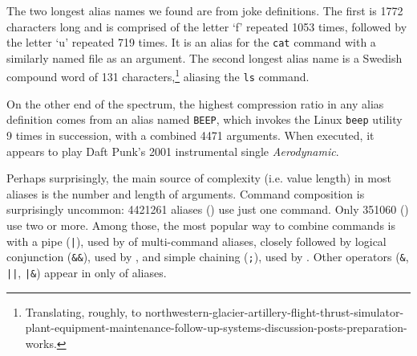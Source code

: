 The two longest alias names we found are from joke definitions.
The first is \num{1772} characters long and is comprised of the letter `f' repeated \num{1053} times, followed by the letter `u' repeated \num{719} times.
It is an alias for the \texttt{cat} command with a similarly named file as an argument.
The second longest alias name is a Swedish compound word of \num{131} characters,\footnote{Translating, roughly, to northwestern-glacier-artillery-flight-thrust-simulator-plant-equipment-maintenance-follow-up-systems-discussion-posts-preparation-works.} aliasing the \texttt{ls} command.

On the other end of the spectrum, the highest compression ratio in any alias definition comes from an alias named \texttt{BEEP}, which invokes the Linux \texttt{beep} utility 9 times in succession, with a combined \num{4471} arguments.
When executed, it appears to play Daft Punk's 2001 instrumental single \emph{Aerodynamic}.

Perhaps surprisingly, the main source of complexity (i.e. value length) in most aliases is the number and length of arguments.
Command composition is surprisingly uncommon: \num{4421261} aliases () use just one command.
Only \num{351060} () use two or more.
Among those, the most popular way to combine commands is with a pipe (\verb!|!), used by  of multi-command aliases, closely followed by logical conjunction (\verb|&&|), used by , and simple chaining (\verb|;|), used by .
Other operators (\verb|&|, \verb!||!, \verb!|&!) appear in only  of aliases.
